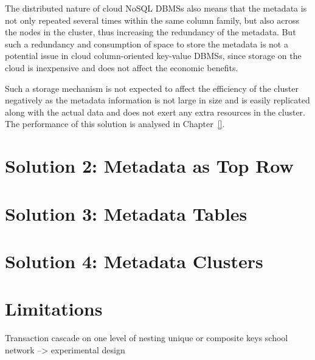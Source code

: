 	
	The distributed nature of cloud \ac{NoSQL} \acp{DBMS} also means that the
	metadata is not only repeated several times within the same column family,  but
	also across the nodes in the cluster, thus increasing the redundancy of
	the metadata.  But such a redundancy and consumption
	of space to store the metadata is not a potential issue 
	in cloud column-oriented key-value \acp{DBMS}, since storage on the cloud is
	inexpensive and  does not affect the economic benefits.
	
	Such a storage mechanism is not expected to affect the efficiency of the
	cluster negatively as the metadata information is not large in size and is
	easily replicated along with the actual data and does not exert any extra
	resources in the cluster.  The performance of this solution is analysed  in
	Chapter~\ref{}. 
	
	
	
\section{Solution 2:  Metadata as Top Row}\label{s:sol2}



\section{Solution 3:  Metadata Tables}\label{s:sol3}



\section{Solution 4:  Metadata Clusters}\label{s:sol4}

\section{Limitations}\label{s:lim}
Transaction
cascade on one level of nesting
unique or composite keys
school network  -->  experimental design




